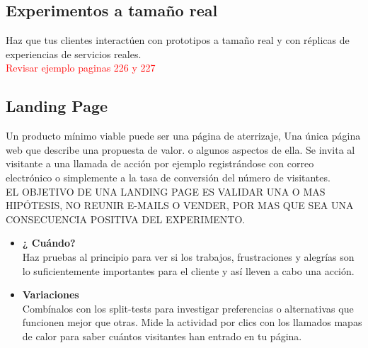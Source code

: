 \documentclass[11pt]{book}
\begin{document}
\subsection{Experimentos a tamaño real}
Haz que tus clientes interactúen con prototipos a tamaño real y con réplicas de experiencias de servicios reales.\\ 
\textcolor{red}{Revisar ejemplo paginas 226 y 227}
\subsection{Landing Page}
Un producto mínimo viable puede ser una página de aterrizaje, Una única página web que describe una propuesta de valor. o algunos aspectos de ella. Se invita al visitante a una llamada de acción por ejemplo registrándose con correo electrónico o simplemente a la tasa de conversión del número de visitantes.\\
EL OBJETIVO DE UNA LANDING PAGE ES VALIDAR UNA O MAS HIPÓTESIS, NO REUNIR E-MAILS O VENDER, POR MAS QUE SEA UNA CONSECUENCIA POSITIVA DEL EXPERIMENTO.
\begin{itemize}
\item \textbf{ ¿ Cuándo? }\\
Haz pruebas al principio para ver si los trabajos, frustraciones y alegrías son lo suficientemente importantes para el cliente y así lleven a cabo una acción.
\item \textbf{ Variaciones }\\
Combínalos con los split-tests para investigar preferencias o alternativas que funcionen mejor que otras. Mide la actividad por clics con los llamados mapas de calor para saber cuántos visitantes han entrado en tu página.
\end{itemize}
\end{document}
